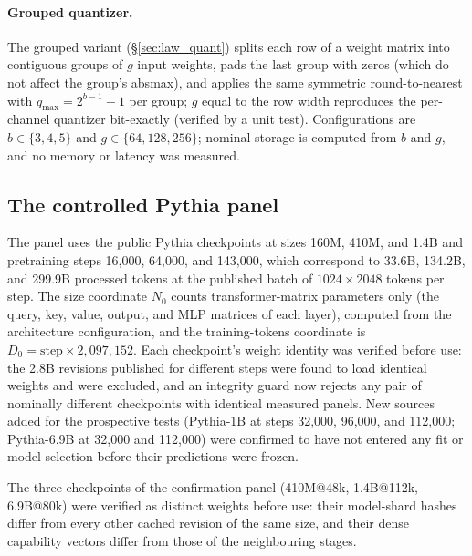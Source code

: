 \paragraph{Grouped quantizer.} The grouped variant (\S\ref{sec:law_quant}) splits each row of a weight matrix into
contiguous groups of $g$ input weights, pads the last group with zeros (which do not affect the group's absmax), and
applies the same symmetric round-to-nearest with $q_{\max}=2^{b-1}-1$ per group; $g$ equal to the row width reproduces
the per-channel quantizer bit-exactly (verified by a unit test). Configurations are $b\in\{3,4,5\}$ and
$g\in\{64,128,256\}$; nominal storage is computed from $b$ and $g$, and no memory or latency was measured.

\subsection{The controlled Pythia panel}
\label{sec:app_pythia}
The panel uses the public Pythia checkpoints at sizes 160M, 410M, and
1.4B and pretraining steps 16{,}000, 64{,}000, and 143{,}000, which
correspond to 33.6B, 134.2B, and 299.9B processed tokens at the
published batch of $1024\times2048$ tokens per step. The size
coordinate $N_0$ counts transformer-matrix parameters only (the query,
key, value, output, and MLP matrices of each layer), computed from the
architecture configuration, and the training-tokens coordinate is
$D_0=\text{step}\times 2{,}097{,}152$. Each checkpoint's weight identity
was verified before use: the 2.8B revisions published for different
steps were found to load identical weights and were excluded, and an
integrity guard now rejects any pair of nominally different checkpoints
with identical measured panels. New sources added for the prospective
tests (Pythia-1B at steps 32{,}000, 96{,}000, and 112{,}000;
Pythia-6.9B at 32{,}000 and 112{,}000) were confirmed to have not
entered any fit or model selection before their predictions were
frozen.

\FloatBarrier
The three checkpoints of the confirmation panel (410M@48k, 1.4B@112k, 6.9B@80k) were verified as distinct weights
before use: their model-shard hashes differ from every other cached revision of the same size, and their dense
capability vectors differ from those of the neighbouring stages.

